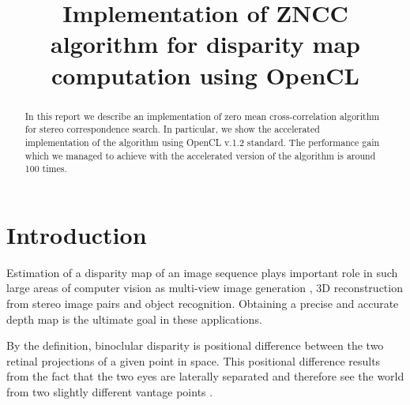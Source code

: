 \documentclass[conference]{IEEEtran}
\begin{document}
%

\title{Implementation of ZNCC algorithm for disparity map computation using OpenCL}

\author{
    \and
}


\maketitle


\begin{abstract}
In this report we describe an implementation of zero mean cross-correlation algorithm for stereo correspondence search. In particular, we show the accelerated implementation of the algorithm using OpenCL v.1.2 standard. The performance gain which we managed to achieve with the accelerated version of the algorithm is around 100 times.
\end{abstract}


\section{Introduction}
Estimation of a disparity map of an image sequence plays important role in such large areas of computer vision as multi-view image generation \cite{}, 3D reconstruction from stereo image pairs \cite{} and object recognition\cite{}. Obtaining a precise and accurate depth map is the ultimate goal in these applications.

By the definition, binoclular disparity is positional difference between the two retinal projections of a given point in space. This positional difference results from the fact that the two eyes are laterally separated and therefore see the world from two slightly different vantage points \cite{Qian1997359}.
\end{document}

